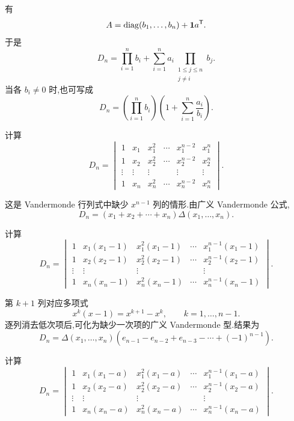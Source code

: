 \begin{solution}
有
\[
A=\operatorname{diag}(b_1,\ldots,b_n)+\boldsymbol{1}a^{\mathsf T}.
\]
于是
\[
\boxed{
D_n
=
\prod\limits_{i=1}^{n}b_i
+
\sum\limits_{i=1}^{n}
a_i
\prod_{\substack{1\leq j\leq n\\j\neq i}}b_j
}.
\]
当各 $b_i\neq0$ 时,也可写成
\[
D_n
=
\left(\prod\limits_{i=1}^{n}b_i\right)
\left(
1+\sum\limits_{i=1}^{n}\dfrac{a_i}{b_i}
\right).
\]
\end{solution}


\begin{example}
计算
\[
D_n=
\begin{vmatrix}
1&x_1&x_1^2&\cdots&x_1^{n-2}&x_1^n\\
1&x_2&x_2^2&\cdots&x_2^{n-2}&x_2^n\\
\vdots&\vdots&\vdots&&\vdots&\vdots\\
1&x_n&x_n^2&\cdots&x_n^{n-2}&x_n^n
\end{vmatrix}.
\]
\end{example}
\exampleblank

\begin{solution}
这是 Vandermonde 行列式中缺少 $x^{n-1}$ 列的情形.由广义 Vandermonde 公式,
\[
\boxed{
D_n
=
(x_1+x_2+\cdots+x_n)
\Delta(x_1,\ldots,x_n)
}.
\]
\end{solution}


\begin{example}
计算
\[
D_n=
\begin{vmatrix}
1&x_1(x_1-1)&x_1^2(x_1-1)&\cdots&x_1^{n-1}(x_1-1)\\
1&x_2(x_2-1)&x_2^2(x_2-1)&\cdots&x_2^{n-1}(x_2-1)\\
\vdots&\vdots&\vdots&&\vdots\\
1&x_n(x_n-1)&x_n^2(x_n-1)&\cdots&x_n^{n-1}(x_n-1)
\end{vmatrix}.
\]
\end{example}
\exampleblank

\begin{solution}
第 $k+1$ 列对应多项式
\[
x^k(x-1)=x^{k+1}-x^k,
\qquad k=1,\ldots,n-1.
\]
逐列消去低次项后,可化为缺少一次项的广义 Vandermonde 型.结果为
\[
\boxed{
D_n
=
\Delta(x_1,\ldots,x_n)
\left(
e_{n-1}-e_{n-2}+e_{n-3}-\cdots+(-1)^{n-1}
\right)
}.
\]
\end{solution}


\begin{example}
计算
\[
D_n=
\begin{vmatrix}
1&x_1(x_1-a)&x_1^2(x_1-a)&\cdots&x_1^{n-1}(x_1-a)\\
1&x_2(x_2-a)&x_2^2(x_2-a)&\cdots&x_2^{n-1}(x_2-a)\\
\vdots&\vdots&\vdots&&\vdots\\
1&x_n(x_n-a)&x_n^2(x_n-a)&\cdots&x_n^{n-1}(x_n-a)
\end{vmatrix}.
\]
\end{example}
\exampleblank

